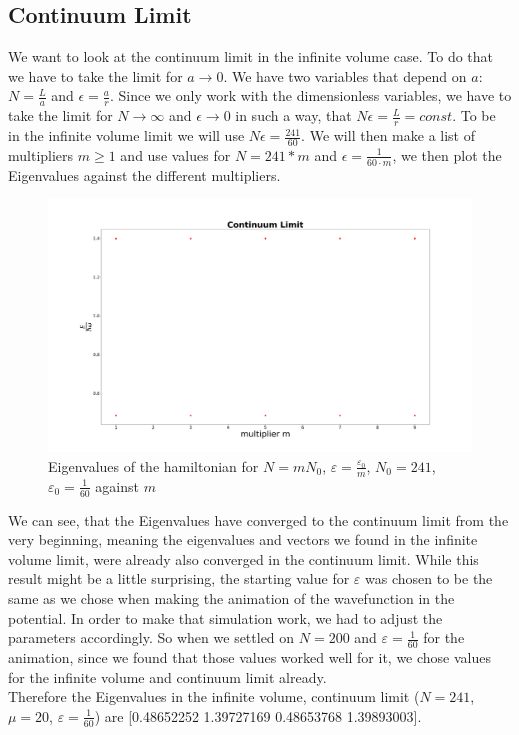 \documentclass[11pt, letterpaper, onecolumn]{article}
\begin{document}
	\subsection{Continuum Limit}
    	We want to look at the continuum limit in the infinite volume case. To do that we have to take the limit for $a\rightarrow0$. We have two variables that depend on $a$: $N=\frac{L}{a}$ and $\epsilon=\frac{a}{r}$. Since we only work with the dimensionless variables, we have to take the limit for $N\rightarrow\infty$ and $\epsilon\rightarrow0$ in such a way, that $N\epsilon=\frac{L}{r}=const$. To be in the infinite volume limit we will use $N\epsilon=\frac{241}{60}$. We will then make a list of multipliers $m\geq1$ and use values for $N=241*m$ and $\epsilon=\frac{1}{60\cdot m}$, we then plot the Eigenvalues against the different multipliers.
	\begin{figure} [H] 
	\begin{center}
	\includegraphics[width=15cm]{"cont_lim_final.png"}
	\caption{Eigenvalues of the hamiltonian for $N=mN_0$, $\varepsilon=\frac{\varepsilon_0}{m}$, $N_0=241$, $\varepsilon_0=\frac{1}{60}$ against $m$}
	\end{center}
	\end{figure}
	We can see, that the Eigenvalues have converged to the continuum limit from the very beginning, meaning the eigenvalues and vectors we found in the infinite volume limit, were already also converged in the continuum limit. While this result might be a little surprising, the starting value for $\varepsilon$ was chosen to be the same as we chose when making the animation of the wavefunction in the potential. In order to make that simulation work, we had to adjust the parameters accordingly. So when we settled on $N=200$ and $\varepsilon=\frac{1}{60}$ for the animation, since we found that those values worked well for it, we chose values for the infinite volume and continuum limit already.\\
	Therefore the Eigenvalues in the infinite volume, continuum limit ($N=241$, $\mu=20$, $\varepsilon=\frac{1}{60}$) are [0.48652252 1.39727169 0.48653768 1.39893003]. 
\end{document}
